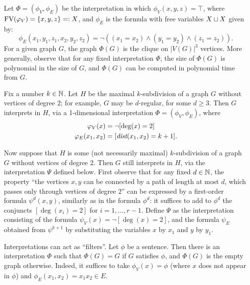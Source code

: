 \begin{example}
	Let $\Phi=(\phi_V,\phi_E)$
	be the interpretation in which
	$\phi_V(x,y,z)=\top$, where $\textrm{FV}(\varphi_V)=\{x,y,z\}=:X$, and  $\phi_E$
	is the formula with free variables $X\sqcup X$
	given by:
 $$\phi_E(x_1,y_1,z_1,x_2,y_2,z_2)=
	\neg ((x_1= x_2)\land (y_1=y_2)\land(z_1=z_2)).$$
	For a given graph $G$, the graph
	$\Phi(G)$ is the clique on $|V(G)|^3$ vertices.
	More generally, observe that for any fixed interpretation $\Phi$,
	the size of $\Phi(G)$ is polynomial in the size of $G$, and $\Phi(G)$
	can be computed in polynomial time from $G$.
\end{example}

\begin{example}\label{ex:subdivision-undo}
  Fix a number $k\in \mathbb{N}$.
	Let $H$ be the maximal $k$-subdivision of a graph $G$
	without vertices of degree $2$; for example, $G$ may be $d$-regular, for some $d\ge 3$.
	Then $G$ interprets in $H$, via a 1-dimensional interpretation $\Phi=(\phi_V,\phi_E)$, where
	\begin{align*}
		\varphi_V(x)&=\neg[\deg(x)=2]\\
		\varphi_E(x_1,x_2)&=[\textit{dist}(x_1,x_2)=k+1].
	\end{align*}
  
  Now suppose that $H$ is some (not necessarily maximal) $k$-subdivision of a graph $G$ without vertices of degree 2. Then $G$ still interprets in $H$, via the interpretation $\Psi$ defined below.
  First observe that for any fixed $d\in\mathbb{N}$, the property ``the vertices $x,y$ 
  can be connected by a path of length at most $d$, which passes only through vertices of degree $2$''
  can be expressed by a first-order formula $\psi^d(x,y)$,
  similarly as in the formula $\phi^d$:
  it suffices to add to $\phi^d$ the conjuncts $[\deg(x_i)=2]$
  for $i=1,\ldots,r-1$.
  Define $\Psi$ as the interpretation consisting of the formula $\psi_V(x)=\neg[\deg(x)=2]$,
  and the formula $\psi_E$ obtained from $\psi^{k+1}$ by substituting the variables $x$ by $x_1$ and $y$ by $y_1$.  
\end{example}

\begin{example}
	Interpretations can act as ``filters''.
	Let $\phi$ be a sentence. Then there is an interpretation $\Phi$
	such that $\Phi(G)=G$ if $G$ satisfies $\phi$, and $\Phi(G)$
	is the empty graph otherwise. Indeed, it suffices to take
	$\phi_V(x)=\phi$ (where $x$ does not appear in $\phi$)  and $\phi_E(x_1,x_2)=x_1x_2\in E$.
\end{example}


